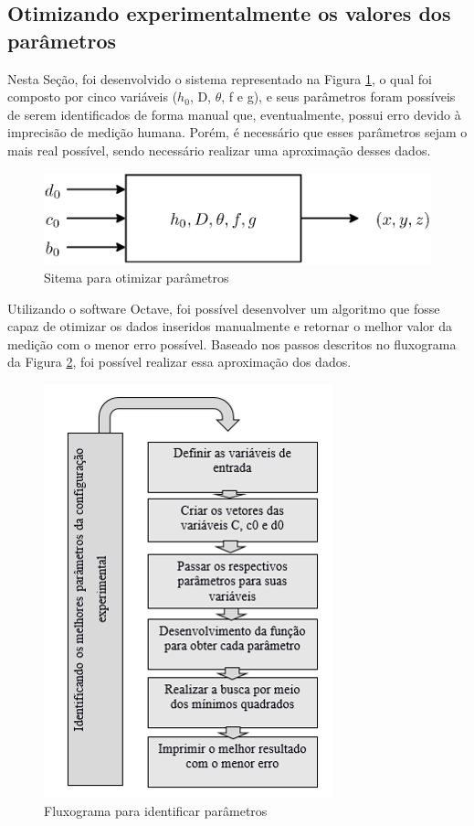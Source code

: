 \documentclass[a4paper, 12pt]{article}
\begin{document}
\subsection{Otimizando experimentalmente os valores dos parâmetros}
\label{subsec:otimizandopar}
Nesta Seção, foi desenvolvido o sistema representado na Figura \ref{sitema_otimizacao}, o qual foi composto por cinco variáveis ($h_0$, D, $\theta$, f e g), e seus parâmetros foram possíveis de serem identificados de forma manual que, eventualmente, possui erro devido à imprecisão de medição humana. Porém, é necessário que esses parâmetros sejam o mais real possível, sendo necessário realizar uma aproximação desses dados.

\begin{figure}[h!]
	\centering
		\includegraphics[width=.55\linewidth]{sitema_otimizacao.eps}
	\caption{Sitema para otimizar parâmetros}
	\label{sitema_otimizacao}
\end{figure}

Utilizando o software Octave, foi possível desenvolver um algoritmo que fosse capaz de otimizar os dados inseridos manualmente e retornar o melhor valor da medição com o menor erro possível. Baseado nos passos descritos no fluxograma da Figura \ref{identificar parametros}, foi possível realizar essa aproximação dos dados.


\begin{figure}[h!]
	\centering
		\includegraphics[width=.55\linewidth]{fluxograma_identificar_parametros.png}
	\caption{Fluxograma para identificar parâmetros}
	\label{identificar parametros}
\end{figure}
\end{document}
